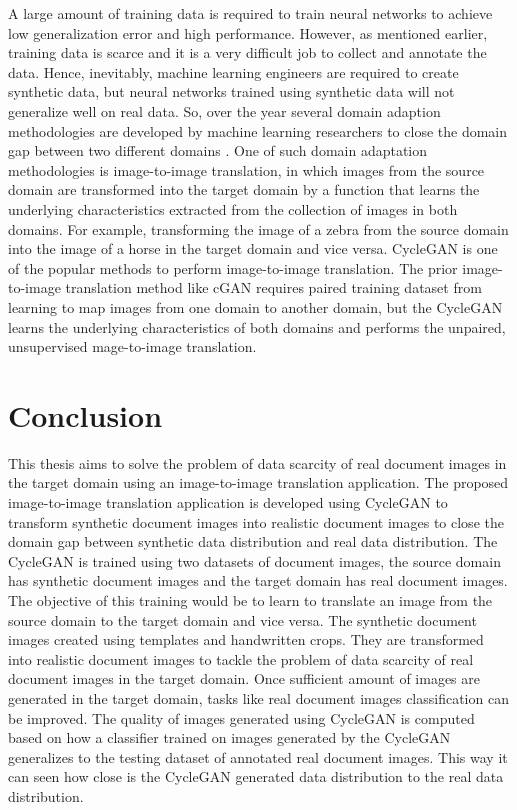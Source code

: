 A large amount of training data is required to train neural networks to achieve low generalization error and high performance. However, as mentioned earlier, training data is scarce and it is a very difficult job to collect and annotate the data. Hence, inevitably, machine learning engineers are required to create synthetic data, but neural networks trained using synthetic data will not generalize well on real data. So, over the year several domain adaption methodologies are developed by machine learning researchers to close the domain gap between two different domains \cite{farahani2020brief}. One of such domain adaptation methodologies is image-to-image translation, in which images from the source domain are transformed into the target domain by a function that learns the underlying characteristics extracted from the collection of images in both domains. For example, transforming the image of a zebra from the source domain into the image of a horse in the target domain and vice versa. \ac{CycleGAN} is one of the popular methods to perform image-to-image translation. The prior image-to-image translation method like \ac{cGAN} requires paired training dataset from learning to map images from one domain to another domain, but the \ac{CycleGAN} learns the underlying characteristics of both domains and performs the unpaired, unsupervised mage-to-image translation.


\section{Conclusion}\label{Conclusion}

This thesis aims to solve the problem of data scarcity of real document images in the target domain using an image-to-image translation application. The proposed image-to-image translation application is developed using \ac{CycleGAN} to transform synthetic document images into realistic document images to close the domain gap between synthetic data distribution and real data distribution. The \ac{CycleGAN} is trained using two datasets of document images, the source domain has synthetic document images and the target domain has real document images. The objective of this training would be to learn to translate an image from the source domain to the target domain and vice versa. The synthetic document images created using templates and handwritten crops. They are transformed into realistic document images to tackle the problem of data scarcity of real document images in the target domain. Once sufficient amount of images are generated in the target domain, tasks like real document images classification can be improved. The quality of images generated using \ac{CycleGAN} is computed based on how a classifier trained on images generated by the \ac{CycleGAN} generalizes to the testing dataset of annotated real document images. This way it can seen how close is the \ac{CycleGAN} generated data distribution to the real data distribution.

